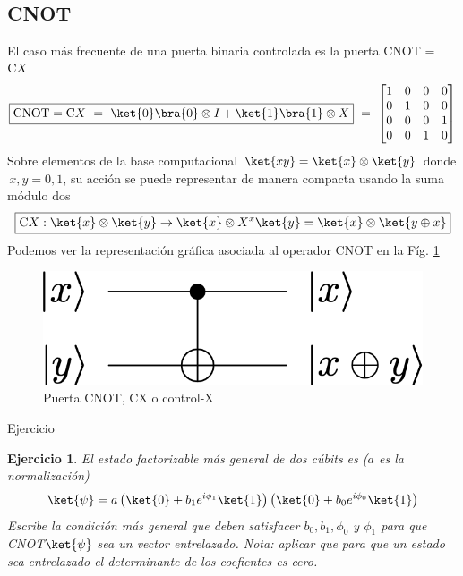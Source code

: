 \documentclass[a4paper,11pt]{book} %
\newtheorem{ejercicio_contador}{Ejercicio}
\newcommand{\Ejercicio}[1]{
		\begin{mybox_gray}{Ejercicio} 
			\begin{ejercicio_contador}
				 #1 
			\end{ejercicio_contador} 
		\end{mybox_gray}
	}
\numberwithin{equation}{chapter}
\def\lp{\left(}
\def\rp{\right)}
\newcommand{\cg}[1]{{\rm C}#1}
\begin{document}
        \subsection{CNOT} 
	
El caso más frecuente de una puerta binaria controlada es la puerta CNOT = $\cg{X}$
	\begin{equation} \label{ec_multiqubit_CNOT}
	\boxed{\hbox{CNOT} = \cg{X} ~=~ \ket{0}\bra{0}\otimes I + \ket{1}\bra{1}\otimes X }
	~=~ \begin{bmatrix} 1 & 0 & 0 & 0 \\ 0 & 1 & 0 & 0 \\ 0 & 0 & 0 & 1 \\ 0 & 0 & 1 & 0\end{bmatrix}
	\end{equation}
Sobre elementos de la base computacional $\ket{xy}=\ket{x}\otimes\ket{y}$ donde $\, x,y= 0,1$, su acción  se puede representar de manera compacta usando la suma módulo dos 
	\begin{equation} \label{ec_multiqubit_CNOT_compu}
	\boxed{\cg{X}:\ket{x}\otimes\ket{y} \rightarrow \ket{x} \otimes X^x\ket{y} = \ket{x} \otimes \ket{y\oplus x}}
	\end{equation}
Podemos ver la representación gráfica asociada al operador CNOT en la Fíg. \ref{Fig_multiqubit_cX_gate}
	\begin{figure}[H]
	\centering 
	\includegraphics[width=0.25\linewidth]{Figuras/Fig_multiqubit_cX_gate.png}
	\caption{Puerta CNOT, CX o control-X}
	\label{Fig_multiqubit_cX_gate}
	\end{figure}

	\Ejercicio{
	El estado factorizable más general de dos cúbits es ($a$ es la normalización)
	\begin{equation}
	\ket{\psi} = a \left(\ket{0} + b_1 e^{i\phi_1}\ket{1} \rp \lp \ket{0} + b_0 e^{i\phi_0} \ket{1} \right) 
	\end{equation}
	Escribe la condición más general que deben satisfacer  $b_0,b_1,\phi_0$ y $\phi_1$ para que CNOT$\ket{\psi}$ 
	sea un vector entrelazado. Nota: aplicar que para que un estado sea entrelazado el determinante de los coefientes es cero.
	}
\end{document}
